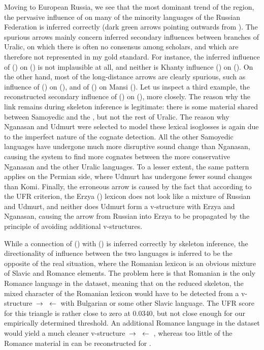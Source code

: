  Moving to European Russia, we see that the most dominant trend of the region, the pervasive influence of  on many of the minority languages of the Russian Federation is inferred correctly (dark green arrows pointing outwards from ). The spurious arrows mainly concern inferred secondary influences between branches of Uralic, on which there is often no consensus among scholars, and which are therefore not represented in my gold standard. For instance, the inferred influence of  () on  () is not implausible at all, and neither is Khanty influence () on  (). On the other hand, most of the long-distance arrows are clearly spurious, such as influence of  () on  (), and of  () on Mansi (). Let us inspect a third example, the reconstructed secondary influence of  () on  (), more closely. The reason why the link remains during skeleton inference is legitimate: there is some material shared between Samoyedic and the , but not the rest of Uralic. The reason why Nganasan and Udmurt were selected to model these lexical isoglosses is again due to the imperfect nature of the cognate detection. All the other Samoyedic languages have undergone much more disruptive sound change than Nganasan, causing the system to find more cognates between the more conservative Nganasan and the other Uralic languages. To a lesser extent, the same pattern applies on the Permian side, where Udmurt has undergone fewer sound changes than Komi. Finally, the erroneous arrow is caused by the fact that according to the UFR criterion, the Erzya () lexicon does not look like a mixture of Russian and Udmurt, and neither does Udmurt form a v-structure with Erzya and Nganasan, causing the arrow from Russian into Erzya to be propagated by the principle of avoiding additional v-structures.
 
 While a connection of  () with  () is inferred correctly by skeleton inference, the directionality of influence between the two languages is inferred to be the opposite of the real situation, where the Romanian lexicon is an obvious mixture of Slavic and Romance elements. The problem here is that Romanian is the only Romance language in the dataset, meaning that on the reduced skeleton, the mixed character of the Romanian lexicon would have to be detected from a v-structure  $\kern 2pt\hbox{$\rightarrow$}\kern 2pt$  $\kern 2pt\hbox{$\leftarrow$}\kern 2pt$  with Bulgarian or some other Slavic language. The UFR score for this triangle is rather close to zero at 0.0340, but not close enough for our empirically determined threshold. An additional Romance language in the dataset would yield a much cleaner v-structure  $\kern 2pt\hbox{$\rightarrow$}\kern 2pt$  $\kern 2pt\hbox{$\leftarrow$}\kern 2pt$ , whereas too little of the Romance material in  can be reconstructed for .
 
